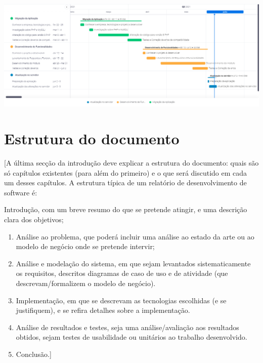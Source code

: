 \begin{center}
        \includegraphics[width=\textwidth,height=\textheight,keepaspectratio]{images/unknown.png}
        \label{fig:gantt}
\end{center}


\section{Estrutura do documento}
 [A última secção da introdução deve explicar a estrutura do documento: quais são só capítulos existentes (para além do primeiro) e o que será discutido em cada um desses capítulos. A estrutura típica de um relatório de desenvolvimento de software é:

 Introdução, com um breve resumo do que se pretende atingir, e uma descrição clara dos objetivos;

\begin{enumerate}
    \item Análise ao problema, que poderá incluir uma análise ao estado da arte ou ao modelo de negócio onde se pretende intervir;
    \item Análise e modelação do sistema, em que sejam levantados sistematicamente os requisitos, descritos diagramas de caso de uso e de atividade (que descrevam/formalizem o modelo de negócio).
    \item Implementação, em que se descrevam as tecnologias escolhidas (e se justifiquem), e se refira detalhes sobre a implementação.
    \item Análise de resultados e testes, seja uma análise/avaliação aos resultados obtidos, sejam testes de usabilidade ou unitários ao trabalho desenvolvido.
    \item Conclusão.]
\end{enumerate}{}
